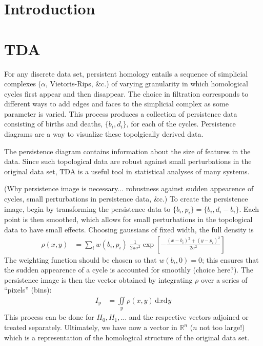 \documentclass[11pt]{article}
\renewcommand{\d}[2][]{\mathrm{d}^{#1}{#2}}
\begin{document}
\section{Introduction}


\section{TDA}
For any discrete data set, persistent homology entails a sequence of simplicial complexes ($\alpha$, Vietoris-Rips, \&c.) of varying granularity in which homological cycles first appear and then disappear. The choice in filtration corresponds to different ways to add edges and faces to the simplicial complex as some parameter is varied. This process produces a collection of persistence data consisting of births and deaths, $\{b_i,d_i\}$, for each of the cycles. Persistence diagrams are a way to visualize these topolgically derived data.

The persistence diagram contains information about the size of features in the data. Since such topological data are robust against small perturbations in the original data set, TDA is a useful tool in statistical analyses of many systems.


(Why persistence image is necessary... robustness against sudden appearence of cycles, small perturbations in persistence data, \&c.) To create the persistence image, begin by transforming the persistence data to $\{b_i,p_i\}=\{b_i,d_i-b_i\}$. Each point is then smoothed, which allows for small perturbations in the topological data to have small effects. Choosing gaussians of fixed width, the full density is
\begin{align}
    \rho(x,y) &= \sum_i w(b_i,p_i)\;\frac{1}{2\pi\sigma^2}\exp\left[-\frac{(x-b_i)^2+(y-p_i)^2}{2\sigma^2}\right]
\end{align}
The weighting function should be chosen so that $w(b_i,0)=0$; this ensures that the sudden appearence of a cycle is accounted for smoothly (choice here?). The persistence image is then the vector obtained by integrating $\rho$ over a series of ``pixels'' (bins):
\begin{align}
    I_\text{p} &= \iint\limits_\text{p}\rho(x,y)\,\d{x}\d{y}
\end{align}
This process can be done for $H_0,H_1,\ldots$ and the respective vectors adjoined or treated separately. Ultimately, we have now a vector in $\mathbb{R}^n$ ($n$ not too large!) which is a representation of the homological structure of the original data set.
\end{document}
